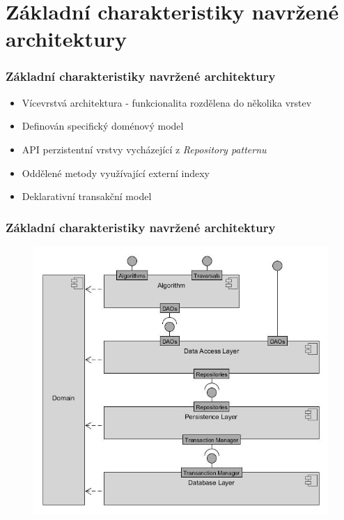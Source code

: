 \documentclass{beamer}
\begin{document}
\section{Základní charakteristiky navržené architektury}
\begin{frame}
\frametitle{Základní charakteristiky navržené architektury}
   \begin{itemize}
      \item Vícevrstvá architektura - funkcionalita rozdělena do několika vrstev
      \item Definován specifický doménový model
      \item API perzistentní vrstvy vycházející z \textit{Repository patternu}
      \item Oddělené metody využívající externí indexy
      \item Deklarativní transakční model
   \end{itemize}
\end{frame}
\begin{frame}
\frametitle{Základní charakteristiky navržené architektury}
   \begin{figure}
   \includegraphics[width=0.7\linewidth]{img/connector_modules}
   \end{figure}
\end{frame}
\end{document}
